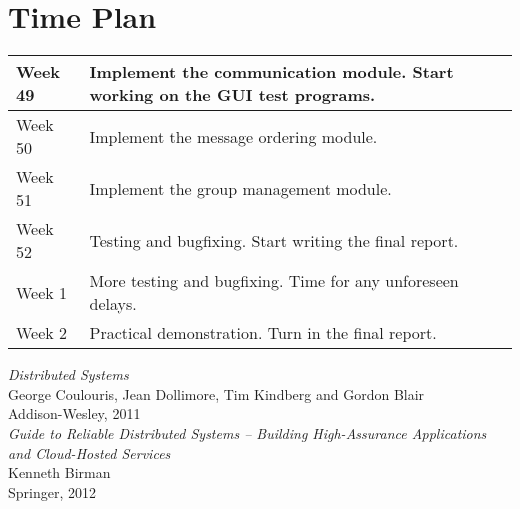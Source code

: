 \documentclass[10pt, oneside]{article}
\begin{document}
\section{Time Plan}

\begin{tabular}{|l|p{10cm}|}
\hline
Week 49 & Implement the communication module. Start working on the GUI test programs. \\
\hline
Week 50 & Implement the message ordering module. \\
\hline
Week 51 & Implement the group management module. \\
\hline
Week 52 & Testing and bugfixing. Start writing the final report. \\
\hline
Week 1  & More testing and bugfixing. Time for any unforeseen delays. \\
\hline
Week 2  & Practical demonstration. Turn in the final report. \\
\hline
\end{tabular}

\begin{thebibliography}{9}

 \emph{Distributed Systems}\\
\newblock George Coulouris, Jean Dollimore, Tim Kindberg and Gordon Blair\\
\newblock Addison-Wesley, 2011\\

 \emph{Guide to Reliable Distributed Systems -- Building
    High-Assurance Applications and Cloud-Hosted Services}\\
\newblock Kenneth Birman\\
\newblock Springer, 2012\\

\end{thebibliography}
\end{document}
